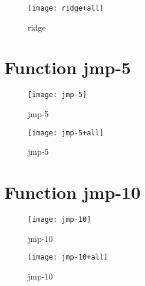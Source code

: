 \begin{figure}[h]
\begin{center}
\texttt{[image: ridge+all]}
\caption{ridge}
\end{center}
\end{figure}

\newpage

\section{Function jmp-5}

\begin{center}

\end{center}

\begin{center}

\end{center}

\begin{figure}[h]
\begin{center}
\texttt{[image: jmp-5]}
\caption{jmp-5}
\end{center}
\end{figure}

\begin{figure}[h]
\begin{center}
\texttt{[image: jmp-5+all]}
\caption{jmp-5}
\end{center}
\end{figure}

\newpage

\section{Function jmp-10}

\begin{center}

\end{center}

\begin{center}

\end{center}

\begin{figure}[h]
\begin{center}
\texttt{[image: jmp-10]}
\caption{jmp-10}
\end{center}
\end{figure}

\begin{figure}[h]
\begin{center}
\texttt{[image: jmp-10+all]}
\caption{jmp-10}
\end{center}
\end{figure}

